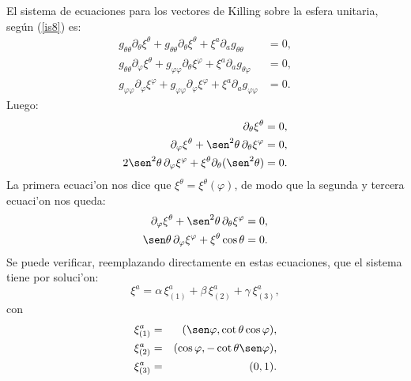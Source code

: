 El sistema de ecuaciones para los vectores de Killing sobre la esfera unitaria,
seg\'{u}n (\ref{is8}) es:
\begin{align}
g_{\theta\theta}\partial_\theta\xi^\theta+g_{\theta\theta}\partial_\theta\xi^\theta +\xi^a\partial_ag_{\theta\theta}  &  =0,\label{isej12}\\
g_{\theta\theta}\partial_\varphi\xi^\theta+g_{\varphi\varphi}\partial_\theta\xi^\varphi +\xi^a\partial_ag_{\theta\varphi}  &  =0, \\
g_{\varphi\varphi}\partial_\varphi\xi^\varphi+g_{\varphi\varphi}\partial_\varphi\xi^\varphi +\xi^a\partial_ag_{\varphi\varphi}  &  =0.
\end{align}
Luego:
\begin{align}
\partial_\theta\xi^\theta  &  =0,\label{isej13}\\
\partial_\varphi\xi^\theta+\sen^2\theta\,\partial_\theta\xi^\varphi  &  =0, \\
2\sen^2\theta\,\partial_\varphi\xi^\varphi+\xi^\theta\partial_\theta(\sen^2\theta)  & =0.
\end{align}
La primera ecuaci'on nos dice que $\xi^\theta=\xi^\theta(\varphi)$, de modo que la
segunda y tercera ecuaci'on nos queda:
\begin{align}
\partial_\varphi\xi^\theta+\sen^2\theta\,\partial_\theta\xi^\varphi  &
=0,\label{isej14}\\
\sen\theta\,\partial_\varphi\xi^\varphi+\xi^\theta\cos\theta  &  =0.
\end{align}
Se puede verificar, reemplazando directamente en estas ecuaciones, que el
sistema tiene por soluci'on:
\begin{equation}
\xi^a=\alpha\,\xi^a_{(1)} +\beta\,\xi^a_{(2)} +\gamma\,\xi^a_{(3)}
,\label{isej15}
\end{equation}
con
\begin{eqnarray}
\xi^a_{(1)} &=&(\sen\varphi, \cot\theta\cos\varphi ), \\
\xi^a_{(2)} &=&(\cos\varphi,-\cot\theta\sen\varphi) , \\
\xi^a_{(3)} &=&(0,1).
\end{eqnarray}

